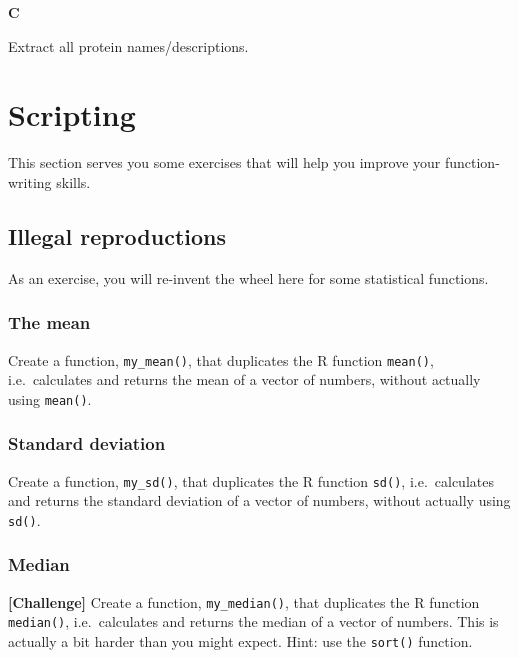 \documentclass[]{book}
\begin{document}
\textbf{C}

Extract all protein names/descriptions.

\hypertarget{scripting-1}{%
\section{Scripting}\label{scripting-1}}

This section serves you some exercises that will help you improve your function-writing skills.

\hypertarget{illegal-reproductions}{%
\subsection{Illegal reproductions}\label{illegal-reproductions}}

As an exercise, you will re-invent the wheel here for some statistical functions.

\hypertarget{the-mean}{%
\subsubsection*{The mean}\label{the-mean}}

Create a function, \texttt{my\_mean()}, that duplicates the R function \texttt{mean()}, i.e.~calculates and returns the mean of a vector of numbers, without actually using \texttt{mean()}.

\hypertarget{standard-deviation}{%
\subsubsection*{Standard deviation}\label{standard-deviation}}

Create a function, \texttt{my\_sd()}, that duplicates the R function \texttt{sd()}, i.e.~calculates and returns the standard deviation of a vector of numbers, without actually using \texttt{sd()}.

\hypertarget{median}{%
\subsubsection*{Median}\label{median}}

\textbf{{[}Challenge{]}} Create a function, \texttt{my\_median()}, that duplicates the R function \texttt{median()}, i.e.~calculates and returns the median of a vector of numbers. This is actually a bit harder than you might expect. Hint: use the \texttt{sort()} function.
\end{document}
